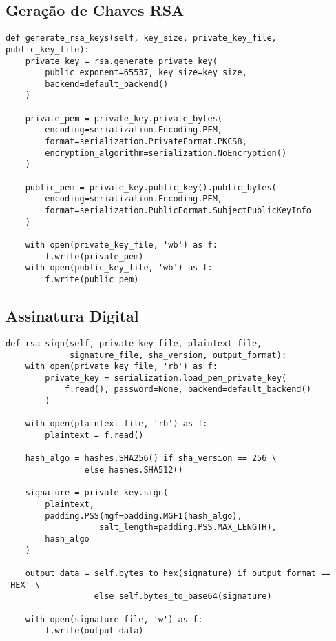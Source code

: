 \documentclass[12pt,a4paper]{article}
\begin{document}
\subsection{Geração de Chaves RSA}

\begin{lstlisting}[caption={Geração de Par RSA}]
def generate_rsa_keys(self, key_size, private_key_file, public_key_file):
    private_key = rsa.generate_private_key(
        public_exponent=65537, key_size=key_size,
        backend=default_backend()
    )
    
    private_pem = private_key.private_bytes(
        encoding=serialization.Encoding.PEM,
        format=serialization.PrivateFormat.PKCS8,
        encryption_algorithm=serialization.NoEncryption()
    )
    
    public_pem = private_key.public_key().public_bytes(
        encoding=serialization.Encoding.PEM,
        format=serialization.PublicFormat.SubjectPublicKeyInfo
    )
    
    with open(private_key_file, 'wb') as f:
        f.write(private_pem)
    with open(public_key_file, 'wb') as f:
        f.write(public_pem)
\end{lstlisting}

\subsection{Assinatura Digital}

\begin{lstlisting}[caption={Assinatura RSA-PSS}]
def rsa_sign(self, private_key_file, plaintext_file, 
             signature_file, sha_version, output_format):
    with open(private_key_file, 'rb') as f:
        private_key = serialization.load_pem_private_key(
            f.read(), password=None, backend=default_backend()
        )
    
    with open(plaintext_file, 'rb') as f:
        plaintext = f.read()
    
    hash_algo = hashes.SHA256() if sha_version == 256 \
                else hashes.SHA512()
    
    signature = private_key.sign(
        plaintext,
        padding.PSS(mgf=padding.MGF1(hash_algo),
                   salt_length=padding.PSS.MAX_LENGTH),
        hash_algo
    )
    
    output_data = self.bytes_to_hex(signature) if output_format == 'HEX' \
                  else self.bytes_to_base64(signature)
    
    with open(signature_file, 'w') as f:
        f.write(output_data)
\end{lstlisting}
\end{document}
